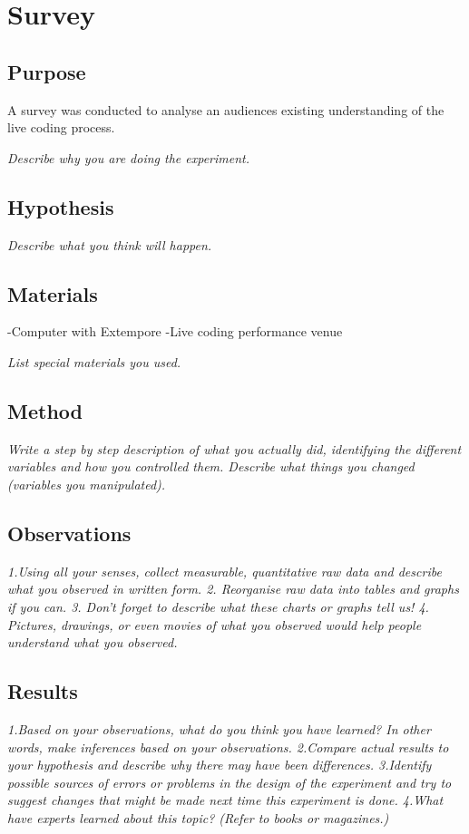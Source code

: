 
\chapter{Survey}
\label{cha:survey}

\section{Purpose}

A survey was conducted to analyse an audiences existing understanding of the live coding process.

\textit{Describe why you are doing the experiment.}

\section{Hypothesis}



\textit{Describe what you think will happen.}
\section{Materials}

-Computer with Extempore
-Live coding performance venue

\textit{List special materials you used.}
\section{Method}
\textit{Write a step by step description of what you actually did, identifying the different variables and how you controlled them. Describe what things you changed (variables you manipulated).}
\section{Observations}
\textit{1.Using all your senses, collect measurable, quantitative raw data and describe what you observed in written form.
2. Reorganise raw data into tables and graphs if you can.
3. Don't forget to describe what these charts or graphs tell us!
4. Pictures, drawings, or even movies of what you observed would help people understand what you observed.}
\section{Results}
\textit{1.Based on your observations, what do you think you have learned? In other words, make inferences based on your observations.
2.Compare actual results to your hypothesis and describe why there may have been differences.
3.Identify possible sources of errors or problems in the design of the experiment and try to suggest changes that might be made next time this experiment is done.
4.What have experts learned about this topic? (Refer to books or magazines.)}

